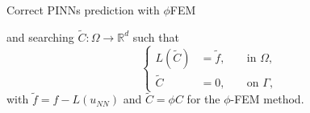 \begin{frame}{Correct PINNs prediction with $\phi$FEM}
	\vspace{-8pt}
	\begin{minipage}{\linewidth}
		and searching $\tilde{C}: \Omega \rightarrow \mathbb{R}^d$ such that
		\begin{equation*}
			\left\{\begin{aligned}
				L(\tilde{C})&=\tilde{f}, \; &&\text{in } \Omega, \\
				\tilde{C}&=0, \; &&\text{on } \Gamma,
			\end{aligned}\right. %
		\end{equation*}
		with $\tilde{f}=f-L(u_{NN})$ and $\tilde{C}=\phi C$ for the $\phi$-FEM method.
	\end{minipage}
\end{frame}